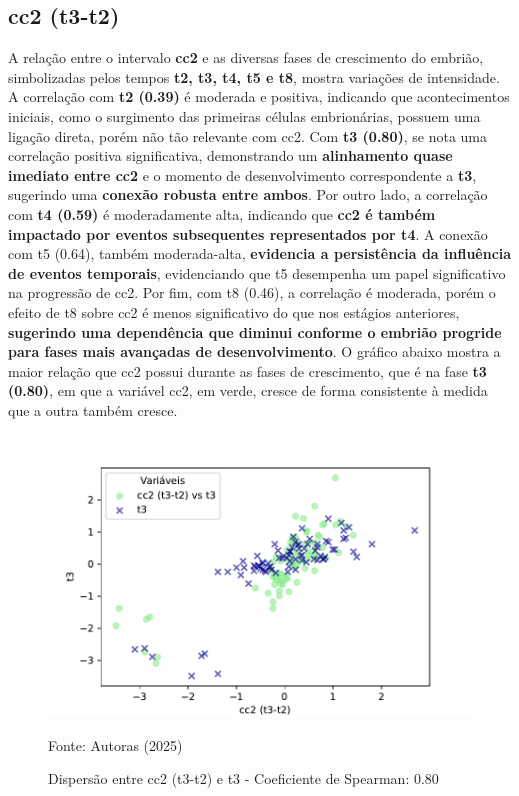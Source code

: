 \subsection*{cc2 (t3-t2)}
A relação entre o intervalo \textbf{cc2} e as diversas fases de crescimento do embrião, simbolizadas pelos tempos \textbf{t2, t3, t4, t5 e t8}, mostra variações de intensidade. A correlação com \textbf{t2 (0.39)} é moderada e positiva, indicando que acontecimentos iniciais, como o surgimento das primeiras células embrionárias, possuem uma ligação direta, porém não tão relevante com cc2. Com \textbf{t3 (0.80)}, se nota uma correlação positiva significativa, demonstrando um \textbf{alinhamento quase imediato entre cc2} e o momento de desenvolvimento correspondente a \textbf{t3}, sugerindo uma \textbf{conexão robusta entre ambos}. Por outro lado, a correlação com \textbf{t4 (0.59)} é moderadamente alta, indicando que \textbf{cc2 é também impactado por eventos subsequentes representados por t4}. A conexão com t5 (0.64), também moderada-alta, \textbf{evidencia a persistência da influência de eventos temporais}, evidenciando que t5 desempenha um papel significativo na progressão de cc2. Por fim, com t8 (0.46), a correlação é moderada, porém o efeito de t8 sobre cc2 é menos significativo do que nos estágios anteriores, \textbf{sugerindo uma dependência que diminui conforme o embrião progride para fases mais avançadas de desenvolvimento}. O gráfico abaixo mostra a maior relação que cc2 possui durante as fases de crescimento, que é na fase \textbf{t3 (0.80)}, em que a variável cc2, em verde, cresce de forma consistente à medida que a outra também cresce. 

\begin{figure}[h]
    \captionsetup{font=footnotesize, justification=centering, labelsep=period, position=above}
    \caption{Dispersão entre cc2 (t3-t2) e t3 - Coeficiente de Spearman: 0.80}
    \label{fig:cc2-t3}
    \centering
    \includegraphics[scale=0.5]{figuras/Spearman/cc2-t3.pdf}
    \vspace{0.3cm} 
    \begin{minipage}{\linewidth}
        \centering
        \scriptsize{Fonte: Autoras (2025)}
    \end{minipage}
\end{figure}
\FloatBarrier

